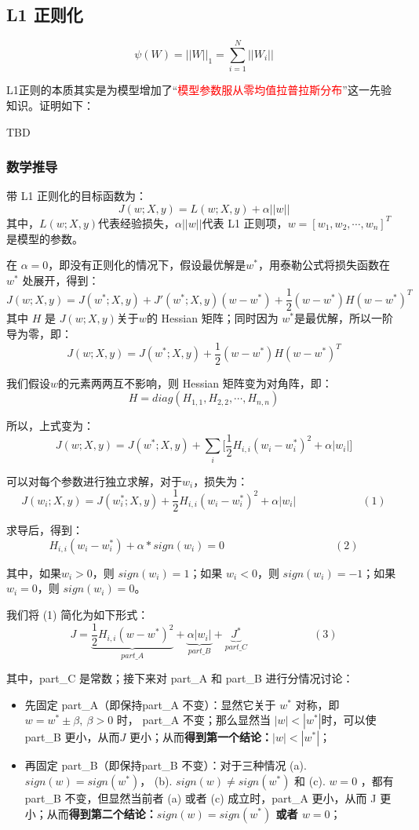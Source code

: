 \documentclass[12pt]{article}
\begin{document}
\subsection{L1 正则化}
$$
\psi(W) = ||W||_1 = \sum_{i=1}^N||W_i||
$$

L1正则的本质其实是为模型增加了“\textcolor{red}{模型参数服从零均值拉普拉斯分布}”这一先验知识。证明如下：

TBD

\subsubsection{数学推导\cite{L1_Normalization_By_Wen}}
带 L1 正则化的目标函数为：
$$
J(w;X,y) = L(w;X,y) + \alpha||w||
$$
其中，$L(w;X,y)$代表经验损失，$\alpha||w||$代表 L1 正则项，$w = [w_1, w_2, \cdots, w_n]^T$ 是模型的参数。

在 $\alpha = 0$，即没有正则化的情况下，假设最优解是$w^*$，用泰勒公式将损失函数在 $w^*$ 处展开，得到：
$$
J(w;X,y) = J(w^*;X,y) + J'(w^*;X,y)(w - w^*) + \frac{1}{2}(w-w^*)H(w-w^*)^T
$$
其中 $H$ 是 $J(w;X,y) $关于$w$的 Hessian 矩阵；同时因为 $w^*$是最优解，所以一阶导为零，即：
$$
J(w;X,y) = J(w^*;X,y)  + \frac{1}{2}(w-w^*)H(w-w^*)^T
$$

我们假设$w$的元素两两互不影响，则 Hessian 矩阵变为对角阵，即：
$$
H = diag(H_{1,1}, H_{2,2}, \cdots, H_{n,n})
$$

所以，上式变为：
$$
J(w;X,y) = J(w^*;X,y)  + \sum_i\Big[ \frac{1}{2}H_{i,i}(w_i - w^*_i)^2 + \alpha|w_i|\Big]
$$

可以对每个参数进行独立求解，对于$w_i$，损失为：
$$
J(w_i;X,y) = J(w^*_i;X,y) + \frac{1}{2}H_{i,i}(w_i - w^*_i)^2 + \alpha|w_i| \qquad \qquad \qquad (1)
$$

求导后，得到：
$$
H_{i,i} (w_i - w^*_i) + \alpha * sign(w_i) = 0 \qquad \qquad \qquad \qquad \qquad   (2)
$$

其中，如果$w_i > 0$，则 $sign(w_i) = 1$；如果 $w_i < 0$，则 $sign(w_i) = -1$；如果 $w_i = 0$，则 $sign(w_i) = 0$。

我们将 (1) 简化为如下形式：
$$
J = \underbrace{\frac{1}{2}H_{i,i}(w - w^*)^2}_{part\_A} + \underbrace{\alpha|w_i|}_{part\_B} + \underbrace{J^*}_{part\_C} \qquad \qquad \qquad (3)
$$

其中，part\_C 是常数；接下来对 part\_A 和 part\_B 进行分情况讨论：
\begin{itemize}
\setlength{\itemsep}{0pt}
\setlength{\parsep}{0pt}
\setlength{\parskip}{0pt}
    \item 先固定 part\_A（即保持part\_A 不变）：显然它关于 $w^*$ 对称，即 $w = w^* \pm \beta, \ \beta > 0$ 时， part\_A 不变；那么显然当 $|w| < |w^*|$时，可以使 part\_B 更小，从而$J$ 更小；从而\textbf{得到第一个结论：$|w| < |w^*|$}；
    \item 再固定 part\_B（即保持part\_B 不变）：对于三种情况 (a). $sign(w) = sign(w^*)$， (b). $sign(w) \neq sign(w^*)$ 和 (c). $w = 0$ ，都有 part\_B 不变，但显然当前者 (a) 或者 (c) 成立时，part\_A 更小，从而 J 更小；从而\textbf{得到第二个结论：$sign(w) = sign(w^*)$ 或者 $w = 0$}；
\end{itemize}
\end{document}
